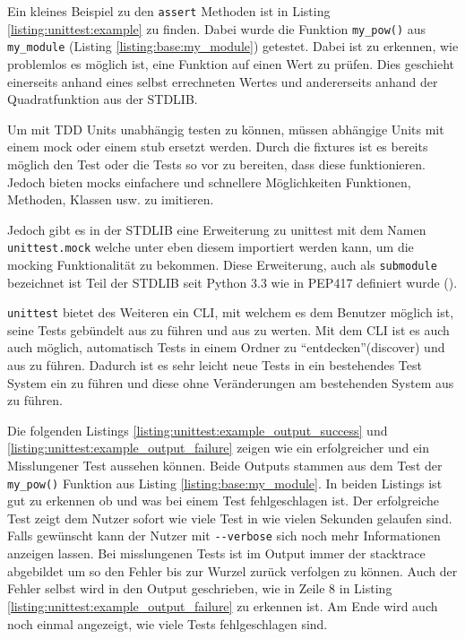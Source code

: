Ein kleines Beispiel zu den \lstinline{assert} Methoden ist in Listing
\ref{listing:unittest:example} zu finden. Dabei wurde die Funktion
\lstinline{my_pow()} aus \lstinline{my_module} (Listing
\ref{listing:base:my_module}) getestet. Dabei ist zu erkennen, wie problemlos
es möglich ist, eine Funktion auf einen Wert zu prüfen. Dies geschieht
einerseits anhand eines selbst errechneten Wertes und andererseits anhand der
Quadratfunktion aus der STDLIB.

Um mit TDD Units unabhängig testen zu können, müssen abhängige Units mit einem
\Gls{mock} oder einem \Gls{stub} ersetzt werden. Durch die \Glspl{fixture} ist
es bereits möglich den Test oder die Tests so vor zu
bereiten, dass diese funktionieren. Jedoch bieten \Glspl{mock} einfachere und
schnellere Möglichkeiten Funktionen, Methoden, Klassen usw. zu imitieren.

Jedoch gibt es in der STDLIB eine Erweiterung zu unittest mit dem Namen
\lstinline{unittest.mock} welche unter eben diesem importiert werden kann, um 
die
\gls{mock}ing Funktionalität zu bekommen. Diese Erweiterung, auch als
\lstinline{submodule} bezeichnet ist Teil der STDLIB seit Python 3.3 wie in
PEP417 definiert wurde (\cite{python.org:PEP417}).

\lstinline{unittest} bietet des Weiteren ein CLI, mit welchem es dem Benutzer 
möglich ist, seine Tests gebündelt aus zu führen und aus zu werten. Mit dem CLI 
ist es auch auch möglich, automatisch Tests in einem Ordner zu 
"`entdecken"'(discover) und aus zu führen. Dadurch ist es sehr leicht neue 
Tests in ein bestehendes Test System ein zu führen und diese ohne Veränderungen 
am bestehenden System aus zu führen.

Die folgenden Listings \ref{listing:unittest:example_output_success} und
\ref{listing:unittest:example_output_failure} zeigen wie ein erfolgreicher und 
ein Misslungener Test aussehen können. Beide Outputs stammen aus dem Test
der \lstinline{my_pow()} Funktion aus Listing \ref{listing:base:my_module}.
In beiden Listings ist gut zu erkennen ob und was bei einem Test fehlgeschlagen 
ist. Der erfolgreiche Test zeigt dem Nutzer sofort wie viele Test in wie vielen 
Sekunden gelaufen sind. Falls gewünscht kann der Nutzer mit  
\lstinline|--verbose| sich noch mehr Informationen anzeigen lassen.
Bei misslungenen Tests ist im Output immer der \gls{stacktrace} abgebildet um 
so den Fehler bis zur Wurzel zurück verfolgen zu können. Auch der Fehler selbst 
wird in den Output geschrieben, wie in Zeile 8 in Listing 
\ref{listing:unittest:example_output_failure} zu erkennen ist. Am Ende wird 
auch noch einmal angezeigt, wie viele Tests fehlgeschlagen sind.

